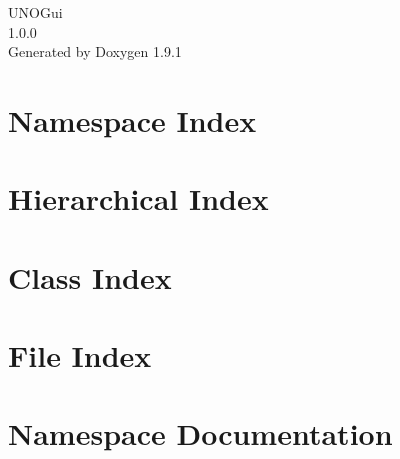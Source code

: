 \let\mypdfximage\pdfximage\def\pdfximage{\immediate\mypdfximage}\documentclass[twoside]{book}
\newcommand{\+}{\discretionary{\mbox{\scriptsize$\hookleftarrow$}}{}{}}
\newcommand{\clearemptydoublepage}{%
  \newpage{\pagestyle{empty}\cleardoublepage}%
}
\begin{document}
\raggedbottom

\begin{titlepage}
\vspace*{7cm}
\begin{center}%
{\Large UNOGui \\[1ex]\large 1.\+0.\+0 }\\
\vspace*{1cm}
{\large Generated by Doxygen 1.9.1}\\
\end{center}
\end{titlepage}
\clearemptydoublepage
{}
\tableofcontents
\clearemptydoublepage
{}

\chapter{Namespace Index}

\chapter{Hierarchical Index}

\chapter{Class Index}

\chapter{File Index}

\chapter{Namespace Documentation}








\end{document}
